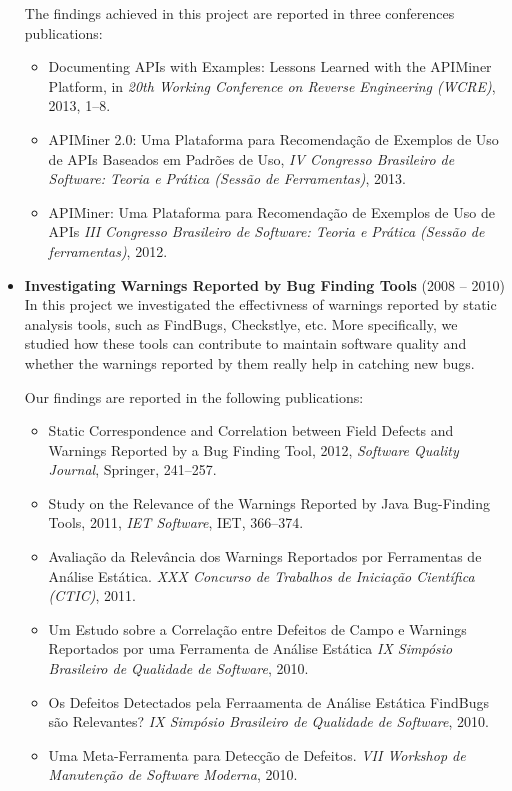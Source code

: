 \begin{itemize}
  The findings achieved in this project are reported in three conferences publications:
  \begin{itemize}
    \item Documenting APIs with Examples: Lessons Learned with the APIMiner Platform, in \textit{20th Working Conference on Reverse Engineering (WCRE)}, 2013, 1--8.
    \item APIMiner 2.0: Uma Plataforma para Recomendação de Exemplos de Uso de APIs Baseados em Padrões de Uso, \textit{IV Congresso Brasileiro de Software: Teoria e Prática (Sessão de Ferramentas)}, 2013. 
    \item APIMiner: Uma Plataforma para Recomendação de Exemplos de Uso de APIs \textit{III Congresso Brasileiro de Software: Teoria e Prática (Sessão de ferramentas)}, 2012.
  \end{itemize}  

  \item \textbf{Investigating Warnings Reported by Bug Finding Tools} (2008 -- 2010) \\
  In this project we investigated the effectivness of warnings reported by static analysis tools, such as FindBugs, Checkstlye, etc. More specifically, we studied how these tools can contribute to maintain software quality and whether the warnings reported by them really help in catching new bugs.
  
  Our findings are reported in the following publications:
  \begin{itemize}
    \item Static Correspondence and Correlation between Field Defects and Warnings Reported by a Bug Finding Tool, 2012, {\it Software Quality Journal}, Springer, 241--257.
    \item Study on the Relevance of the Warnings Reported by Java Bug-Finding Tools, 2011, {\it IET Software}, IET, 366--374.
    \item Avaliação da Relevância dos Warnings Reportados por Ferramentas de Análise Estática. \textit{XXX Concurso de Trabalhos de Iniciação Científica (CTIC)}, 2011.
    \item Um Estudo sobre a Correlação entre Defeitos de Campo e Warnings Reportados por uma Ferramenta de Análise Estática \textit{IX Simpósio Brasileiro de Qualidade de Software}, 2010.
    \item Os Defeitos Detectados pela Ferraamenta de Análise Estática FindBugs são Relevantes? \textit{IX Simpósio Brasileiro de Qualidade de Software}, 2010.
    \item Uma Meta-Ferramenta para Detecção de Defeitos. \textit{VII Workshop de Manutenção de Software Moderna}, 2010. 
  \end{itemize}
\end{itemize}